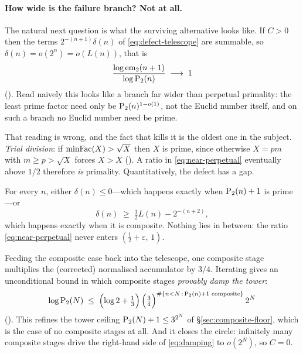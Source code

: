\paragraph{How wide is the failure branch?  Not at all.}
The natural next question is what the surviving alternative looks like.
If $C > 0$ then the terms $2^{-(n+1)}\delta(n)$ of
\eqref{eq:defect-telescope} are summable, so
$\delta(n) = o(2^{n}) = o(L(n))$, that is
\begin{equation}
\label{eq:near-perpetual}
  \frac{\log \mathrm{em}_{2}(n+1)}{\log \mathrm{P}_{2}(n)} \;\longrightarrow\; 1
\end{equation}
().
Read naively this looks like a branch far wider than perpetual primality:
the least prime factor need only be $\mathrm{P}_{2}(n)^{1-o(1)}$, not the Euclid
number itself, and on such a branch no Euclid number need be prime.

That reading is wrong, and the fact that kills it is the oldest one in the
subject.  \emph{Trial division}: if $\mathrm{minFac}(X) > \sqrt X$ then $X$ is
prime, since otherwise $X = pm$ with $m \geq p > \sqrt X$ forces $X > X$
().  A ratio in
\eqref{eq:near-perpetual} eventually above $1/2$ therefore \emph{is}
primality.  Quantitatively, the defect has a gap.

\begin{lemma}
\label{lem:defect-gap}
For every $n$, either $\delta(n) \leq 0$---which happens exactly when
$\mathrm{P}_{2}(n)+1$ is prime---or
\[
  \delta(n) \;\geq\; \tfrac12 L(n) - 2^{-(n+2)} ,
\]
which happens exactly when it is composite.  Nothing lies in between: the
ratio \eqref{eq:near-perpetual} never enters $(\tfrac12 + \varepsilon,\, 1)$.
\end{lemma}

\noindent
Feeding the composite case back into the telescope, one composite stage
multiplies the (corrected) normalised accumulator by $3/4$.  Iterating
gives an unconditional bound in which composite stages \emph{provably damp
the tower}:
\begin{equation}
\label{eq:damping}
  \log \mathrm{P}_{2}(N)
  \;\leq\;
  \Bigl(\log 2 + \tfrac13\Bigr)\,
  \Bigl(\tfrac34\Bigr)^{\#\{n<N\,:\,\mathrm{P}_{2}(n)+1 \text{ composite}\}}
  \, 2^{N}
\end{equation}
().  This
refines the tower ceiling $\mathrm{P}_{2}(N)+1 \leq 3^{2^N}$ of
\S\ref{sec:composite-floor}, which is the case of no composite stages at
all.  And it closes the circle: infinitely many composite stages drive the
right-hand side of \eqref{eq:damping} to $o(2^N)$, so $C = 0$.

